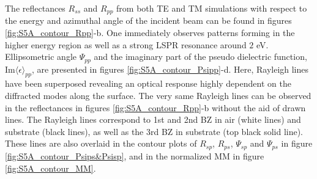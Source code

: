 The reflectances $R_{ss}$ and $R_{pp}$ from both TE and TM simulations with respect to the energy and azimuthal angle of the incident beam can be found in figures \ref{fig:S5A_contour_Rpp}-b. One immediately observes patterns forming in the higher energy region as well as a strong LSPR resonance around $2$ eV. Ellipsometric angle $\Psi_{pp}$ and the imaginary part of the pseudo dielectric function, $\text{Im}\langle\epsilon\rangle_{pp}$, are presented in figures \ref{fig:S5A_contour_Psipp}-d. Here, Rayleigh lines have been superposed revealing an optical response highly dependent on the diffracted modes along the surface. The very same Rayleigh lines can be observed in the reflectances in figures \ref{fig:S5A_contour_Rpp}-b without the aid of drawn lines. The Rayleigh lines correspond to 1st and 2nd BZ in air (white lines) and substrate (black lines), as well as the 3rd BZ in substrate (top black solid line). These lines are also overlaid in the contour plots of $R_{sp}$, $R_{ps}$, $\Psi_{sp}$ and $\Psi_{ps}$ in figure \ref{fig:S5A_contour_Psips&Psisp}, and in the normalized MM in figure \ref{fig:S5A_contour_MM}.

